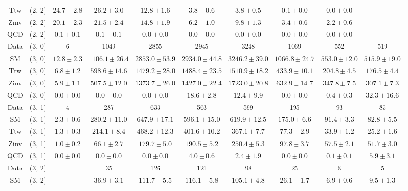 \begin{table}[h!]
{\begin{tabular}{cccccccccc}
	Ttw & (2, 2) & $24.7\pm 2.8$ & $26.2\pm 3.0$ & $12.8\pm 1.6$ & $3.8\pm 0.6$ & $3.8\pm 0.5$ & $0.1\pm 0.0$ & $0.0\pm 0.0$ & -- \\[0.5ex] 
	Zinv & (2, 2) & $20.1\pm 2.3$ & $21.5\pm 2.4$ & $14.8\pm 1.9$ & $6.2\pm 1.0$ & $9.8\pm 1.3$ & $3.4\pm 0.6$ & $2.2\pm 0.6$ & -- \\[0.5ex] 
	QCD & (2, 2) & $0.1\pm 0.1$ & $0.1\pm 0.1$ & $0.0\pm 0.0$ & $0.0\pm 0.0$ & $0.0\pm 0.0$ & $0.0\pm 0.0$ & $0.0\pm 0.0$ & -- \\[0.5ex] 
	Data & (3, 0) & 6 & 1049 & 2855 & 2945 & 3248 & 1069 & 552 & 519 \\[0.5ex] 
	SM & (3, 0) & $12.8\pm 2.3$ & $1106.1\pm 26.4$ & $2853.0\pm 53.9$ & $2934.0\pm 44.8$ & $3246.2\pm 39.0$ & $1066.8\pm 24.7$ & $553.0\pm 12.0$ & $515.9\pm 19.0$ \\[0.5ex] 
	Ttw & (3, 0) & $6.8\pm 1.2$ & $598.6\pm 14.6$ & $1479.2\pm 28.0$ & $1488.4\pm 23.5$ & $1510.9\pm 18.2$ & $433.9\pm 10.1$ & $204.8\pm 4.5$ & $176.5\pm 4.4$ \\[0.5ex] 
	Zinv & (3, 0) & $5.9\pm 1.1$ & $507.5\pm 12.0$ & $1373.7\pm 26.0$ & $1427.0\pm 22.4$ & $1723.0\pm 20.8$ & $632.9\pm 14.7$ & $347.8\pm 7.5$ & $307.1\pm 7.3$ \\[0.5ex] 
	QCD & (3, 0) & $0.0\pm 0.0$ & $0.0\pm 0.0$ & $0.0\pm 0.0$ & $18.6\pm 2.8$ & $12.4\pm 9.9$ & $0.0\pm 0.0$ & $0.4\pm 0.3$ & $32.3\pm 16.6$ \\[0.5ex] 
	Data & (3, 1) & 4 & 287 & 633 & 563 & 599 & 195 & 93 & 83 \\[0.5ex] 
	SM & (3, 1) & $2.3\pm 0.6$ & $280.2\pm 11.0$ & $647.9\pm 17.1$ & $596.1\pm 15.0$ & $619.9\pm 12.5$ & $175.0\pm 6.6$ & $91.4\pm 3.3$ & $82.8\pm 5.5$ \\[0.5ex] 
	Ttw & (3, 1) & $1.3\pm 0.3$ & $214.1\pm 8.4$ & $468.2\pm 12.3$ & $401.6\pm 10.2$ & $367.1\pm 7.7$ & $77.3\pm 2.9$ & $33.9\pm 1.2$ & $25.2\pm 1.6$ \\[0.5ex] 
	Zinv & (3, 1) & $1.0\pm 0.2$ & $66.1\pm 2.7$ & $179.7\pm 5.0$ & $190.5\pm 5.2$ & $250.4\pm 5.3$ & $97.8\pm 3.7$ & $57.5\pm 2.1$ & $51.7\pm 3.0$ \\[0.5ex] 
	QCD & (3, 1) & $0.0\pm 0.0$ & $0.0\pm 0.0$ & $0.0\pm 0.0$ & $4.0\pm 0.6$ & $2.4\pm 1.9$ & $0.0\pm 0.0$ & $0.1\pm 0.1$ & $5.9\pm 3.1$ \\[0.5ex] 
	Data & (3, 2) & -- & 35 & 126 & 121 & 98 & 25 & 8 & 5 \\[0.5ex] 
	SM & (3, 2) & -- & $36.9\pm 3.1$ & $111.7\pm 5.5$ & $116.1\pm 5.8$ & $105.1\pm 4.8$ & $26.1\pm 1.7$ & $6.9\pm 0.6$ & $9.5\pm 1.3$ \\[0.5ex] 

\end{tabular}}
\end{table}
